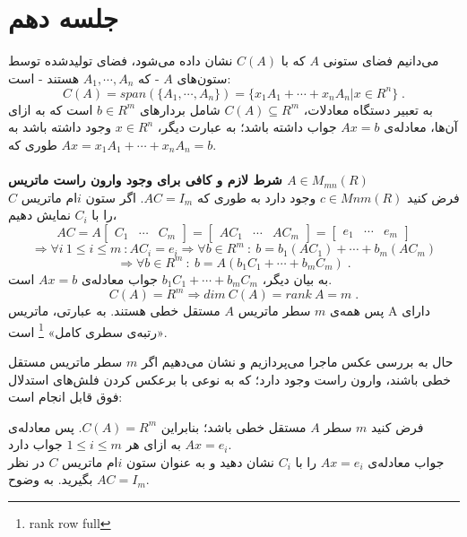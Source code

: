 \chapter{جلسه دهم}
می‌دانیم فضا‌ی ستونی $A$ که با $C(A)$ نشان داده می‌شود، فضا‌ی تولید‌شده توسط ستون‌های $A$ - که $A_1, \cdots, A_n$ هستند - است:
$$C(A)=span(\{A_1,\cdots,A_n\}) = \{x_1A_1+\cdots+x_nA_n|x\in R^n\} \; .$$
به تعبیر دستگاه معادلات، $C(A)\subseteq R^m$ شامل بردار‌های $b\in R^m$ است که به ازای آن‌ها، معادله‌ی $Ax=b$ جواب داشته باشد؛ به عبارت دیگر، $x\in R^n$ وجود داشته باشد به طوری که $Ax=x_1A_1+\cdots+x_nA_n=b$.\\\\
\textbf{شرط لازم و کافی برای وجود وارون راست ماتریس $A\in M_{mn}(R)$}\\
فرض کنید $c\in M{nm}(R)$ وجود دارد به طوری که $AC=I_m$. اگر ستون $i$ام ماتریس $C$ را با $C_i$ نمایش دهیم،
$$AC = A\begin{bmatrix}
C_1 & \cdots& C_m
\end{bmatrix} = \begin{bmatrix}
AC_1 & \cdots& AC_m
\end{bmatrix} = \begin{bmatrix}
e_1 & \cdots& e_m
\end{bmatrix}$$
$$\Rightarrow \forall i \: 1\leq i \leq m \: : AC_i = e_i \Rightarrow \forall b \in R^m \: : \: b = b_1 (AC_1)+ \cdots+ b_m(AC_m)$$
$$\Rightarrow \forall b \in R^m \: : \: b= A(b_1C_1+\cdots+ b_mC_m) \; . $$
به بیان دیگر،
$b_1C_1+\cdots+ b_mC_m$ جواب معادله‌ی $Ax=b$ است.
$$C(A) = R^m \Rightarrow dim\: C(A) = rank\: A = m \; . $$
پس همه‌ی
$m$ سطر ماتریس $A$ مستقل خطی هستند.
به عبارتی، ماتریس A دارای «رتبه‌ی سطری کامل» \footnote{rank row full} است.

حال به بررسی عکس ماجرا می‌پردازیم و نشان می‌دهیم اگر $m$ سطر ماتریس مستقل خطی باشند، وارون راست وجود دارد؛ که به نوعی با برعکس کردن فلش‌های استدلال فوق قابل انجام است:

فرض کنید $m$ سطر $A$ مستقل خطی باشد؛ بنابراین $C(A)=R^m$. پس معادله‌ی $Ax=e_i$ به ازای هر $1\leq i \leq m$ جواب دارد.\\
جواب معادله‌ی $Ax=e_i$ را با $C_i$ نشان دهید و به عنوان ستون $i$ام ماتریس $C$ در نظر بگیرید. به وضوح $AC = I_m$.

